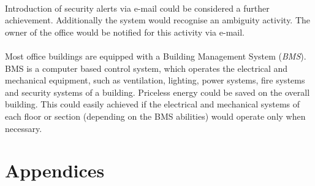 \documentclass[12pt,a4paper,draft]{report}
\begin{document}
\ \\
Introduction of security alerts via e-mail could be considered a further achievement. Additionally the system would recognise an ambiguity activity. The owner of the office would be notified for this activity via e-mail.\\
\ \\
Most office buildings are equipped with a Building Management System (\textit{BMS}). BMS is a computer based control system, which  operates the electrical and mechanical equipment, such as ventilation, lighting, power systems, fire systems and security systems of a building. Priceless energy could be saved on the overall building. This could easily achieved if the electrical and mechanical systems of each floor or section (depending on the BMS abilities) would operate only when necessary.
%
\newpage
%


%
\newpage
%
\chapter*{Appendices}
%
\end{document}
